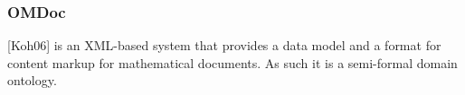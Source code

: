 \begin{frame}
  \frametitle{OMDoc}
  \begin{module}[id=OMDoc]
    \begin{definition}  [Koh06] is an XML-based system that provides a data model and a format for content markup for mathematical documents. As such it is a semi-formal domain ontology.\\ \end{definition} 

  \end{module}
\end{frame}
